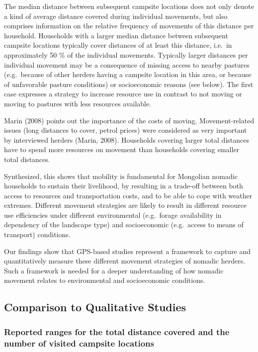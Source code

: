 \documentclass[]{elsarticle} %
\begin{document}
The median distance between subsequent campsite locations does not only
denote a kind of average distance covered during individual movements,
but also comprises information on the relative frequency of movements of
this distance per household. Households with a larger median distance
between subsequent campsite locations typically cover distances of at
least this distance, i.e.~in approximately 50 \% of the individual
movements. Typically larger distances per individual movement may be a
consequence of missing access to nearby pastures (e.g.~because of other
herders having a campsite location in this area, or because of
unfavorable pasture conditions) or socioeconomic reasons (see below).
The first case expresses a strategy to increase resource use in contrast
to not moving or moving to pastures with less resources available.

Marin (2008) points out the importance of the costs of moving.
Movement-related issues (long distances to cover, petrol prices) were
considered as very important by interviewed herders (Marin, 2008).
Households covering larger total distances have to spend more resources
on movement than households covering smaller total distances.

Synthesized, this shows that mobility is fundamental for Mongolian
nomadic households to sustain their livelihood, by resulting in a
trade-off between both access to resources and transportation costs, and
to be able to cope with weather extremes. Different movement strategies
are likely to result in different resource use efficiencies under
different environmental (e.g.~forage availability in dependency of the
landscape type) and socioeconomic (e.g.~access to means of transport)
conditions.

Our findings show that GPS-based studies represent a framework to
capture and quantitatively measure these different movement strategies
of nomadic herders. Such a framework is needed for a deeper
understanding of how nomadic movement relates to environmental and
socioeconomic conditions.

\hypertarget{comparison-to-qualitative-studies}{%
\subsection{Comparison to Qualitative
Studies}\label{comparison-to-qualitative-studies}}

\hypertarget{reported-ranges-for-the-total-distance-covered-and-the-number-of-visited-campsite-locations}{%
\subsubsection{Reported ranges for the total distance covered and the
number of visited campsite
locations}\label{reported-ranges-for-the-total-distance-covered-and-the-number-of-visited-campsite-locations}}
\end{document}
